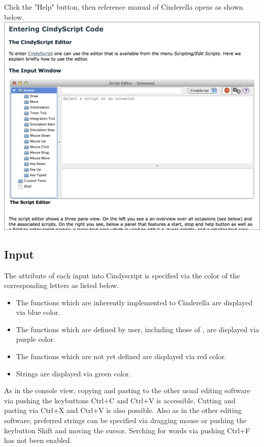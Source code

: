 \documentclass[papersize,a4paper,12pt]{article}
\begin{document}
Click the "Help" button, 
then reference manual of Cinderella opens 
as shown below. \\

\includegraphics[bb=0.00 0.00 712.04 577.03,width=14cm]{Fig/CindyhelpE.pdf}


\subsection{Input}

The attribute of each input into Cindyscript 
is specified via the color of the corresponding letters 
as listed below. 

\begin{itemize}
\item 
The functions which are inherently implemented to Cinderella 
are displayed via blue color. 
\item 
The functions which are defined by user, 
including those of \ketcindy , 
are displayed via purple color. 
\item 
The functions which are not yet defined 
are displayed via red color. 
\item 
Strings are displayed via green color. 
\end{itemize}
As in the console view, 
copying and pasting to the other usual editing software 
via pushing the keybuttons Ctrl+C and Ctrl+V 
is accessible. 
Cutting and pasting via Ctrl+X and Ctrl+V 
is also possible. 
Also as in the other editing software, 
preferred strings can be specified 
via dragging mouse 
or pushing the keybutton Shift and moving the sursor. 
Serching for words via pushing Ctrl+F 
has not been enabled. 
\end{document}
